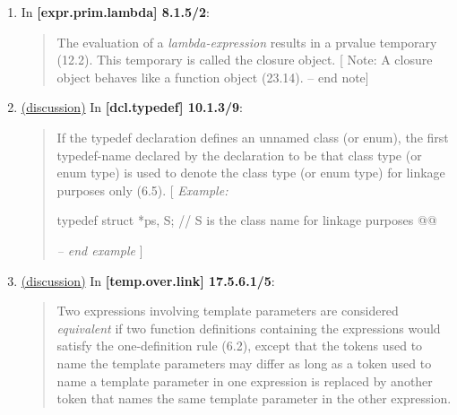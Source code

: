 \documentclass{wg21}
\begin{document}
\begin{enumerate}
  \item \label{wording.remove}
    In \textbf{[expr.prim.lambda] 8.1.5/2}:
    \begin{quote}
      The evaluation of a \textit{lambda-expression} results in a prvalue
      temporary (12.2). This temporary is called the closure object.  [ Note: A closure object behaves like a function object
      (23.14). -- end note]
    \end{quote}

  \item \label{wording.non-template} \hyperref[discussion.non-template]{(discussion)}
    In \textbf{[dcl.typedef] 10.1.3/9}:
    \begin{quote}
      If the typedef declaration defines an unnamed class (or enum), the first
      typedef-name declared by the declaration to be that class type (or enum type)
      is used to denote the class type (or enum type) for linkage purposes only (6.5).
      [ \textit{Example:}
\begin{codeblock}
typedef struct { } *ps, S; // S is the class name for linkage purposes
@@
\end{codeblock}
      \textit{-- end example} ]
    \end{quote}
  \item \label{wording.template} \hyperref[discussion.template]{(discussion)}
    In \textbf{[temp.over.link] 17.5.6.1/5}:
    \begin{quote}
      Two expressions involving template parameters are considered \textit{equivalent}
      if two function definitions containing the expressions would satisfy the
      one-definition rule (6.2), except that the tokens used to name the template
      parameters may differ as long as a token used to name a template parameter
      in one expression is replaced by another token that names the same template
      parameter in the other expression. 
    \end{quote}


\end{enumerate}
\end{document}
